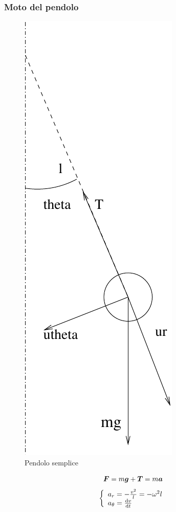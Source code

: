 \subsubsection{Moto del pendolo}
\begin{figure}[htbp]
\centering
\includegraphics[scale=0.4]{immagini/fisica1/pendolo_forza}
\caption{Pendolo semplice}
\end{figure}
\begin{equation*}\boldsymbol{F}=m\boldsymbol{g}+\boldsymbol{T}=m\boldsymbol{a}\end{equation*}
\begin{equation*}\left\{
  \begin{array}{l}
  a_r=-\frac{v^2}{l}=-\omega^2 l\\
  a_\theta=\frac{\mathrm{d} v}{\mathrm{d} t}
  \end{array}
  \right.\end{equation*}
